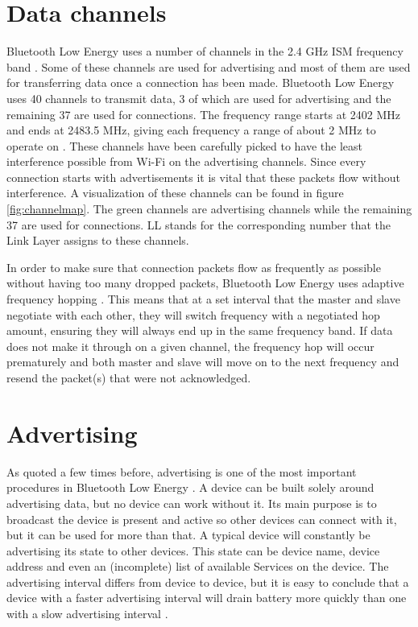 \documentclass[pdftex,a4paper,12pt,twoside]{report}
\begin{document}
\section{Data channels}
\label{sec:channels}
Bluetooth Low Energy uses a number of channels in the 2.4 GHz ISM frequency band \citep{heydon2012bluetooth}. Some of these channels are used for advertising and most of them are used for transferring data once a connection has been made. Bluetooth Low Energy uses 40 channels to transmit data, 3 of which are used for advertising and the remaining 37 are used for connections. The frequency range starts at 2402 MHz and ends at 2483.5 MHz, giving each frequency a range of about 2 MHz to operate on \citep{bluetooth2014bluetooth}. These channels have been carefully picked to have the least interference possible from Wi-Fi on the advertising channels. Since every connection starts with advertisements it is vital that these packets flow without interference. A visualization of these channels can be found in figure \ref{fig:channelmap}. The green channels are advertising channels while the remaining 37 are used for connections. LL stands for the corresponding number that the Link Layer assigns to these channels.

In order to make sure that connection packets flow as frequently as possible without having too many dropped packets, Bluetooth Low Energy uses adaptive frequency hopping \citep{bluetooth2014bluetooth}. This means that at a set interval that the master and slave negotiate with each other, they will switch frequency with a negotiated hop amount, ensuring they will always end up in the same frequency band. If data does not make it through on a given channel, the frequency hop will occur prematurely and both master and slave will move on to the next frequency and resend the packet(s) that were not acknowledged.

\section{Advertising}
\label{sec:advertising}
As quoted a few times before, advertising is one of the most important procedures in Bluetooth Low Energy \citep{Townsend2014}. A device can be built solely around advertising data, but no device can work without it. Its main purpose is to broadcast the device is present and active so other devices can connect with it, but it can be used for more than that. A typical device will constantly be advertising its state to other devices. This state can be device name, device address and even an (incomplete) list of available Services on the device. The advertising interval differs from device to device, but it is easy to conclude that a device with a faster advertising interval will drain battery more quickly than one with a slow advertising interval \citep{kamath2010measuring, heydon2012bluetooth}.
\end{document}
